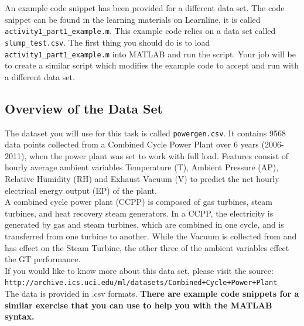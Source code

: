 \documentclass[12pt]{article}
\begin{document}
An example code snippet has been provided for a different data set. The code snippet can be found in the learning materials on Learnline, it is called \verb|activity1_part1_example.m|. This example code relies on a data set called \verb|slump_test.csv|. The first thing you should do is to load \verb|activity1_part1_example.m| into MATLAB and run the script. Your job will be to create a similar script which modifies the example code to accept and run with a different data set. 

\subsection*{Overview of the Data Set}
The dataset you will use for this task is called \verb|powergen.csv|. It contains 9568 data points collected from a Combined Cycle Power Plant over 6 years (2006-2011), when the power plant was set to work with full load. Features consist of hourly average ambient variables Temperature (T), Ambient Pressure (AP), Relative Humidity (RH) and Exhaust Vacuum (V) to predict the net hourly electrical energy output (EP)  of the plant.\\

A combined cycle power plant (CCPP) is composed of gas turbines, steam turbines, and heat recovery steam generators. In a CCPP, the electricity is generated by gas and steam turbines, which are combined in one cycle, and is transferred from one turbine to another. While the Vacuum is collected from and has effect on the Steam Turbine, the other three of the ambient variables effect the GT performance.\\

If you would like to know more about this data set, please visit the source:\\

\verb|http://archive.ics.uci.edu/ml/datasets/Combined+Cycle+Power+Plant|\\

The data is provided in .csv formats. \textbf{There are example code snippets for a similar exercise that you can use to help you with the MATLAB syntax.}
\end{document}
